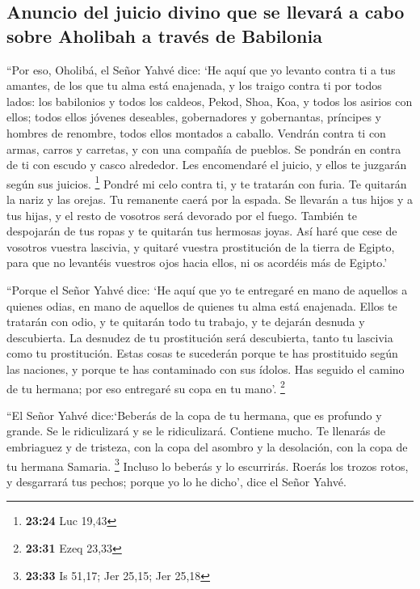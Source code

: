 \begin{paracol}{2}
{\subsection{Anuncio del juicio divino que se llevará a cabo sobre
Aholibah a través de
Babilonia}\label{anuncio-del-juicio-divino-que-se-llevaruxe1-a-cabo-sobre-aholibah-a-travuxe9s-de-babilonia}}

 ``Por eso, Oholibá, el Señor Yahvé dice: `He aquí que yo
levanto contra ti a tus amantes, de los que tu alma está enajenada, y
los traigo contra ti por todos lados:  los babilonios y
todos los caldeos, Pekod, Shoa, Koa, y todos los asirios con ellos;
todos ellos jóvenes deseables, gobernadores y gobernantas, príncipes y
hombres de renombre, todos ellos montados a caballo. 
Vendrán contra ti con armas, carros y carretas, y con una compañía de
pueblos. Se pondrán en contra de ti con escudo y casco alrededor. Les
encomendaré el juicio, y ellos te juzgarán según sus juicios.
\footnote{\textbf{23:24} Luc 19,43}  Pondré mi celo
contra ti, y te tratarán con furia. Te quitarán la nariz y las orejas.
Tu remanente caerá por la espada. Se llevarán a tus hijos y a tus hijas,
y el resto de vosotros será devorado por el fuego. 
También te despojarán de tus ropas y te quitarán tus hermosas joyas.
 Así haré que cese de vosotros vuestra lascivia, y
quitaré vuestra prostitución de la tierra de Egipto, para que no
levantéis vuestros ojos hacia ellos, ni os acordéis más de Egipto.'

 ``Porque el Señor Yahvé dice: `He aquí que yo te
entregaré en mano de aquellos a quienes odias, en mano de aquellos de
quienes tu alma está enajenada.  Ellos te tratarán con
odio, y te quitarán todo tu trabajo, y te dejarán desnuda y descubierta.
La desnudez de tu prostitución será descubierta, tanto tu lascivia como
tu prostitución.  Estas cosas te sucederán porque te has
prostituido según las naciones, y porque te has contaminado con sus
ídolos.  Has seguido el camino de tu hermana; por eso
entregaré su copa en tu mano'. \footnote{\textbf{23:31} Ezeq 23,33}

 ``El Señor Yahvé dice:`Beberás de la copa de tu hermana,
que es profundo y grande. Se le ridiculizará y se le ridiculizará.
Contiene mucho.  Te llenarás de embriaguez y de tristeza,
con la copa del asombro y la desolación, con la copa de tu hermana
Samaria. \footnote{\textbf{23:33} Is 51,17; Jer 25,15; Jer 25,18}
 Incluso lo beberás y lo escurrirás. Roerás los trozos
rotos, y desgarrará tus pechos; porque yo lo he dicho', dice el Señor
Yahvé.


\end{paracol}
